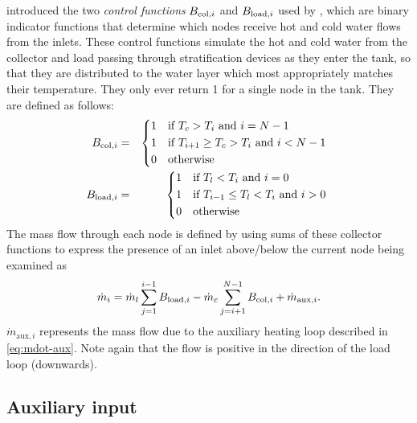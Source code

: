  introduced the two \emph{control functions} $B_{\text{col}, i}$ and $B_{\text{load}, i}$ used by , which are binary indicator functions that determine which nodes receive hot and cold water flows from the inlets.
These control functions simulate the hot and cold water from the collector and load passing through stratification devices as they enter the tank, so that they are distributed to the water layer which most appropriately matches their temperature.
They only ever return 1 for a single node in the tank.
They are defined as follows:
\begin{eqnarray}
   \B{col} &=& \begin{dcases*}
      1 & if $T_c > T_i$ and $i = N-1$ \\
      1 & if $T_{i+1} \ge T_c > T_i$ and $i < N-1$ \\
      0 & otherwise
   \end{dcases*}
   \\
   \B{load} &=& \begin{dcases*}
      1 & if $T_l < T_i$ and $i = 0$ \\
      1 & if $T_{i-1} \le T_l < T_i$ and $i > 0$ \\
      0 & otherwise
   \end{dcases*}
\end{eqnarray}
The mass flow through each node is defined by  using sums of these collector functions to express the presence of an inlet above/below the current node being examined as
\begin{equation}
	\label{eq:mdot}
   \dot{m}_i = \dot{m}_l \sum_{j=1}^{i-1} B_{\text{load}, i}
             - \dot{m}_c \sum_{j=i+1}^{N-1} B_{\text{col}, i}
             + \dot{m}_{\text{aux}, i}.
\end{equation}
$\dot{m}_{\text{aux}, i}$ represents the mass flow due to the auxiliary heating loop described in \autoref{eq:mdot-aux}.
Note again that the flow is positive in the direction of the load loop (downwards).

\subsection{Auxiliary input}

